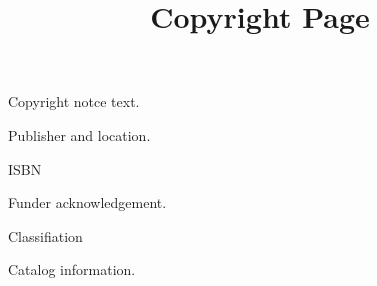 \documentclass{article}
\begin{document}
\title{Copyright Page}

\maketitle


Copyright notce text.


Publisher and location.


ISBN


Funder acknowledgement.


Classifiation


Catalog information.
\end{document}
